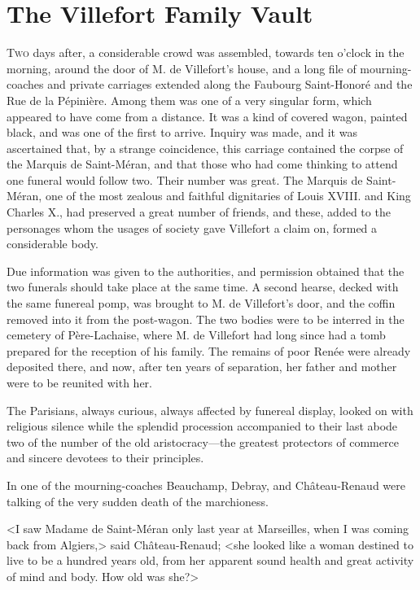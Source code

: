 \chapter{The Villefort Family Vault} 

 \lettrine{T}{wo} days after, a considerable crowd was assembled, towards ten o'clock in the morning, around the door of M. de Villefort's house, and a long file of mourning-coaches and private carriages extended along the Faubourg Saint-Honoré and the Rue de la Pépinière. Among them was one of a very singular form, which appeared to have come from a distance. It was a kind of covered wagon, painted black, and was one of the first to arrive. Inquiry was made, and it was ascertained that, by a strange coincidence, this carriage contained the corpse of the Marquis de Saint-Méran, and that those who had come thinking to attend one funeral would follow two. Their number was great. The Marquis de Saint-Méran, one of the most zealous and faithful dignitaries of Louis XVIII. and King Charles X., had preserved a great number of friends, and these, added to the personages whom the usages of society gave Villefort a claim on, formed a considerable body. 

 Due information was given to the authorities, and permission obtained that the two funerals should take place at the same time. A second hearse, decked with the same funereal pomp, was brought to M. de Villefort's door, and the coffin removed into it from the post-wagon. The two bodies were to be interred in the cemetery of Père-Lachaise, where M. de Villefort had long since had a tomb prepared for the reception of his family. The remains of poor Renée were already deposited there, and now, after ten years of separation, her father and mother were to be reunited with her. 

 The Parisians, always curious, always affected by funereal display, looked on with religious silence while the splendid procession accompanied to their last abode two of the number of the old aristocracy—the greatest protectors of commerce and sincere devotees to their principles. 

 In one of the mourning-coaches Beauchamp, Debray, and Château-Renaud were talking of the very sudden death of the marchioness. 

 <I saw Madame de Saint-Méran only last year at Marseilles, when I was coming back from Algiers,> said Château-Renaud; <she looked like a woman destined to live to be a hundred years old, from her apparent sound health and great activity of mind and body. How old was she?> 

